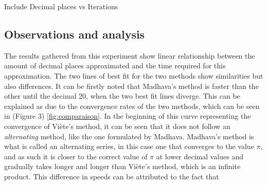 

Include Decimal places vs Iterations

\subsection{Observations and analysis}

The results gathered from this experiment show linear relationship between the amount of decimal 
places approximated and the time required for this approximation. The two lines of best fit for 
the two methods show similarities but also differences. It can be firstly noted that Madhava's 
method is faster than the other until the decimal 20, when the two best fit lines diverge. This 
can be explained as due to the convergence rates of the two methods, which can be seen in (Figure 3) 
\ref{fig:comparaison}. In the beginning of this curve representing the convergence of Viète's method, 
it can be seen that it does not follow an \textit{alternating} method, like the one formulated by 
Madhava. Madhava's method is what is called an alternating series, in this case one that converges 
to the value $\pi$, and as such it is closer to the correct value of $\pi$ at lower decimal values 
and gradually takes longer and longer than Viète's method, which is an infinite product. This difference 
in speeds can be attributed to the fact that 



